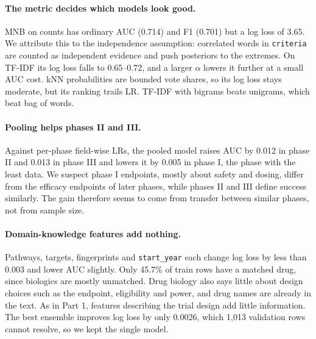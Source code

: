 \paragraph{The metric decides which models look good.}
MNB on counts has ordinary AUC (0.714) and F1 (0.701) but a log loss of 3.65.
We attribute this to the independence assumption: correlated words in \texttt{criteria} are counted as independent evidence and push posteriors to the extremes.
On TF-IDF its log loss falls to 0.65--0.72, and a larger $\alpha$ lowers it further at a small AUC cost.
kNN probabilities are bounded vote shares, so its log loss stays moderate, but its ranking trails LR.
TF-IDF with bigrams beats unigrams, which beat bag of words.

\paragraph{Pooling helps phases II and III.}
Against per-phase field-wise LRs, the pooled model raises AUC by 0.012 in phase II and 0.013 in phase III and lowers it by 0.005 in phase I, the phase with the least data.
We suspect phase I endpoints, mostly about safety and dosing, differ from the efficacy endpoints of later phases, while phases II and III define success similarly.
The gain therefore seems to come from transfer between similar phases, not from sample size.

\paragraph{Domain-knowledge features add nothing.}
Pathways, targets, fingerprints and \texttt{start\_year} each change log loss by less than 0.003 and lower AUC slightly.
Only 45.7\% of train rows have a matched drug, since biologics are mostly unmatched.
Drug biology also says little about design choices such as the endpoint, eligibility and power, and drug names are already in the text.
As in Part 1, features describing the trial design add little information.
The best ensemble improves log loss by only 0.0026, which 1,013 validation rows cannot resolve, so we kept the single model.


